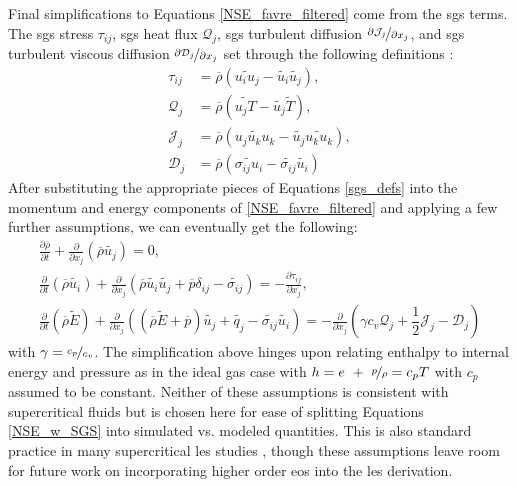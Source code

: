 Final simplifications to Equations \ref{NSE_favre_filtered} come from the \gls{sgs} terms. The \gls{sgs} stress $\tau_{ij}$, \gls{sgs} heat flux $\mathcal{Q}_j$, \gls{sgs} turbulent diffusion $\nicefrac{\partial \mathcal{J}_j}{\partial x_j}$, and \gls{sgs} turbulent viscous diffusion $\nicefrac{\partial \mathcal{D}_j}{\partial x_j}$ set through the following definitions \cite{LES_Comp}:
\begin{equation} \label{sgs_defs}
\begin{aligned}
\tau_{ij} &= \overline{\rho}\left(\widetilde{u_i u_j} - \widetilde{u_i}\widetilde{u_j} \right), \\
\mathcal{Q}_{j} &= \overline{\rho}\left(\widetilde{u_j T} - \widetilde{u_j}\widetilde{T} \right), \\
\mathcal{J}_{j} &= \overline{\rho}\left(\widetilde{u_j u_k u_k} - \widetilde{u_j}\widetilde{u_k u_k} \right), \\
\mathcal{D}_{j} &= \overline{\rho}\left(\widetilde{\sigma_{ij}u_i} - \widetilde{\sigma_{ij}}\widetilde{u_i} \right)
\end{aligned}
\end{equation} 
After substituting the appropriate pieces of Equations \ref{sgs_defs} into the momentum and energy components of \ref{NSE_favre_filtered} and applying a few further assumptions, we can eventually get the following:
\begin{subequations} \label{NSE_w_SGS}
\begin{align}
  \frac{\partial\overline{\rho}}{\partial t} + \frac{\partial }{\partial x_j} \left( \overline{\rho}\widetilde{ u_j} \right) = 0, \label{NSE_mass_sgs} \\
  \frac{\partial}{\partial t} \left( \overline{\rho}\widetilde{ u_i }\right) + \frac{\partial}{\partial x_j} \left(\overline{\rho}\widetilde{ u_i} \widetilde{u_j} + \overline{p }\delta_{ij} - \widetilde{\sigma_{ij}} \right) = - \frac{\partial \tau_{ij}}{\partial x_j}, \label{NSE_mom_sgs}  \\
  \frac{\partial}{\partial t} \left( \overline{\rho}\widetilde{ E} \right) + \frac{\partial}{\partial x_j} \left(\left( \overline{\rho}\widetilde{ E}+\overline{p} \right)\widetilde{u_j} + \widetilde{q_j} - \widetilde{\sigma_{ij}}\widetilde{ u_i}\right) = - \frac{\partial}{\partial x_j } \left( \gamma c_v \mathcal{Q}_j + \dfrac{1}{2} \mathcal{J}_j - \mathcal{D}_j \right)  \label{NSE_E_sgs}
\end{align}
\end{subequations}
with $\gamma = \nicefrac{c_p}{c_v}$. The simplification above hinges upon relating enthalpy to internal energy and pressure as in the ideal gas case with $h = e ~+~ \nicefrac{p}{\rho} = c_p T$ with $c_p$ assumed to be constant. Neither of these assumptions is consistent with supercritical fluids but is chosen here for ease of splitting Equations \ref{NSE_w_SGS} into simulated vs. modeled quantities. This is also standard practice in many supercritical \gls{les} studies \cite{}, though these assumptions leave room for future work on incorporating higher order \gls{eos} into the \gls{les} derivation. 

